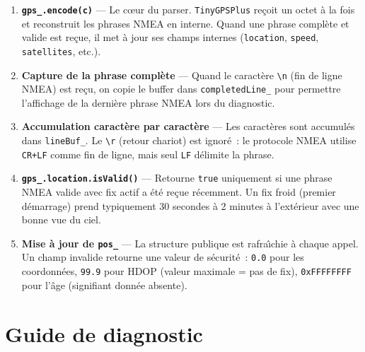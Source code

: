 \documentclass[12pt,a4paper]{article}
\newcommand{\code}[1]{\texttt{#1}}
\begin{document}
\begin{enumerate}
  \item \textbf{\code{gps\_.encode(c)}} --- Le c\oe{}ur du parser. \code{TinyGPSPlus}
        re\c{c}oit un octet \`a la fois et reconstruit les phrases NMEA en interne.
        Quand une phrase compl\`ete et valide est re\c{c}ue, il met \`a jour ses
        champs internes (\code{location}, \code{speed}, \code{satellites}, etc.).

  \item \textbf{Capture de la phrase compl\`ete} --- Quand le caract\`ere
        \code{\textbackslash{}n} (fin de ligne NMEA) est re\c{c}u, on copie le
        buffer dans \code{completedLine\_} pour permettre l'affichage de la
        derni\`ere phrase NMEA lors du diagnostic.

  \item \textbf{Accumulation caract\`ere par caract\`ere} --- Les caract\`eres
        sont accumul\'es dans \code{lineBuf\_}. Le \code{\textbackslash{}r}
        (retour chariot) est ignor\'e~: le protocole NMEA utilise \code{CR+LF}
        comme fin de ligne, mais seul \code{LF} d\'elimite la phrase.

  \item \textbf{\code{gps\_.location.isValid()}} --- Retourne \code{true}
        uniquement si une phrase NMEA valide avec fix actif a \'et\'e re\c{c}ue
        r\'ecemment. Un fix froid (premier d\'emarrage) prend typiquement
        30 secondes \`a 2 minutes \`a l'ext\'erieur avec une bonne vue du ciel.

  \item \textbf{Mise \`a jour de \code{pos\_}} --- La structure publique est
        rafra\^{\i}chie \`a chaque appel. Un champ invalide retourne une valeur
        de s\'ecurit\'e~: \code{0.0} pour les coordonn\'ees, \code{99.9} pour
        HDOP (valeur maximale = pas de fix), \code{0xFFFFFFFF} pour l'\^age
        (signifiant donn\'ee absente).
\end{enumerate}

\section{Guide de diagnostic}
\end{document}
